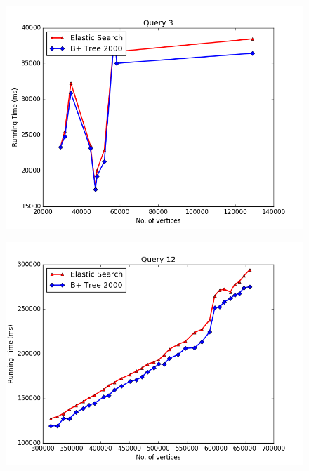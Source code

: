\begin{figure}[H]
\centering
\begin{minipage}{0.33\textwidth}
  \centering
  \includegraphics[width=1\linewidth]{Figures/figure_3}
  \label{fig:test1}
\end{minipage}%
\begin{minipage}{.33\textwidth}
  \centering
  \includegraphics[width=1\linewidth]{Figures/figure_12}
  \label{fig:test2}
\end{minipage}
\begin{minipage}{.33\textwidth}
  \centering

\end{minipage}
\end{figure}
